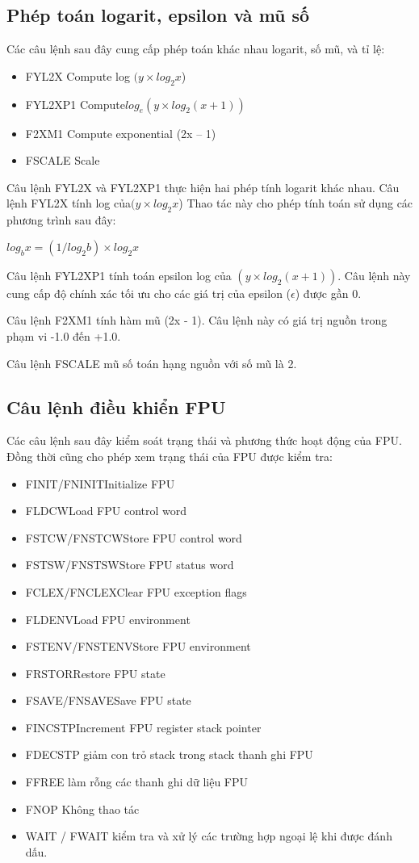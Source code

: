 		\subsection*{Phép toán logarit, epsilon và mũ số}
		Các câu lệnh sau đây cung cấp phép toán khác nhau logarit, số mũ, và tỉ lệ:
		\begin{itemize}
			\renewcommand{\labelitemi}{}
			\item		FYL2X Compute log $(y \times log_{2}x$)
			\item		FYL2XP1 Compute$ log_{e} (y \times log_{2}(x + 1))$
			\item		F2XM1 Compute exponential (2x – 1)
			\item		FSCALE Scale
		\end{itemize}

	Câu lệnh FYL2X và FYL2XP1 thực hiện hai phép tính logarit khác nhau. Câu lệnh FYL2X tính log của$ (y \times log_{2}x$) Thao tác này cho phép tính toán sử dụng các phương trình sau đây:
	
	
		$log_{b}x = (1 / log_{2}b) \times log_{2} x$
		
		
		Câu lệnh FYL2XP1 tính toán epsilon log của $(y \times  log_{2}(x + 1))$. Câu lệnh này cung cấp độ chính xác tối ưu cho các giá trị của epsilon ($\epsilon$) được gần 0.
		
		
		Câu lệnh F2XM1 tính hàm mũ (2x - 1). Câu lệnh này có giá trị nguồn trong phạm vi -1.0 đến +1.0.
		
		
		
		Câu lệnh FSCALE mũ số toán hạng nguồn với số mũ là 2.
		
		\subsection*{Câu lệnh điều khiển FPU}
		Các câu lệnh sau đây kiểm soát trạng thái và phương thức hoạt động của FPU. Đồng thời cũng cho phép xem trạng thái của FPU được kiểm tra:
		\begin{itemize}
			\renewcommand{\labelitemi}{}
			\item		FINIT/FNINITInitialize FPU
			\item		FLDCWLoad FPU control word
			\item		FSTCW/FNSTCWStore FPU control word
			\item		FSTSW/FNSTSWStore FPU status word
			\item		 FCLEX/FNCLEXClear FPU exception flags
			\item		FLDENVLoad FPU environment
			\item		FSTENV/FNSTENVStore FPU environment
			\item		FRSTORRestore FPU state
			\item		FSAVE/FNSAVESave FPU state
			\item		FINCSTPIncrement FPU register stack pointer
			\item		FDECSTP giảm con trỏ stack trong stack thanh ghi FPU
			\item		FFREE làm rỗng các thanh ghi dữ liệu FPU
			\item		FNOP Không thao tác
			\item		WAIT / FWAIT kiểm tra và xử lý các trường hợp ngoại lệ khi được đánh dấu.
		\end{itemize}

